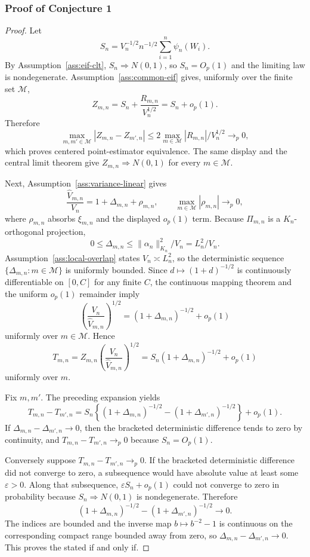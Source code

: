 \documentclass[11pt]{article}
\theoremstyle{definition}
\theoremstyle{plain}
\theoremstyle{remark}
\begin{document}
\subsubsection*{Proof of Conjecture 1}
\begin{proof}
Let
\[
  S_n=V_n^{-1/2}n^{-1/2}\sum_{i=1}^n\psi_n(W_i).
\]
By Assumption~\ref{ass:eif-clt}, \(S_n\Rightarrow N(0,1)\), so \(S_n=O_p(1)\)
and the limiting law is nondegenerate.  Assumption~\ref{ass:common-eif} gives,
uniformly over the finite set \(\mathcal M\),
\[
  Z_{m,n}=S_n+\frac{R_{m,n}}{V_n^{1/2}}
  =S_n+o_p(1).
\]
Therefore
\[
  \max_{m,m'\in\mathcal M}|Z_{m,n}-Z_{m',n}|
  \le
  2\max_{m\in\mathcal M}|R_{m,n}|/V_n^{1/2}
  \to_p0,
\]
which proves centered point-estimator equivalence.  The same display and the
central limit theorem give \(Z_{m,n}\Rightarrow N(0,1)\) for every
\(m\in\mathcal M\).

Next, Assumption~\ref{ass:variance-linear} gives
\[
  \frac{\hat V_{m,n}}{V_n}=1+\Delta_{m,n}+\rho_{m,n},
  \qquad
  \max_{m\in\mathcal M}|\rho_{m,n}|\to_p0,
\]
where \(\rho_{m,n}\) absorbs \(\xi_{m,n}\) and the displayed \(o_p(1)\) term.
Because \(\Pi_{m,n}\) is a \(K_n\)-orthogonal projection,
\[
  0\le\Delta_{m,n}
  \le \|\alpha_n\|_{K_n}^2/V_n
  =L_n^2/V_n.
\]
Assumption~\ref{ass:local-overlap} states \(V_n\asymp L_n^2\), so the
deterministic sequence \(\{\Delta_{m,n}:m\in\mathcal M\}\) is uniformly
bounded.  Since \(d\mapsto(1+d)^{-1/2}\) is continuously differentiable on
\([0,C]\) for any finite \(C\), the continuous mapping theorem and the
uniform \(o_p(1)\) remainder imply
\[
  \left(\frac{V_n}{\hat V_{m,n}}\right)^{1/2}
  =
  (1+\Delta_{m,n})^{-1/2}+o_p(1)
\]
uniformly over \(m\in\mathcal M\).  Hence
\[
  T_{m,n}
  =
  Z_{m,n}\left(\frac{V_n}{\hat V_{m,n}}\right)^{1/2}
  =
  S_n(1+\Delta_{m,n})^{-1/2}+o_p(1)
\]
uniformly over \(m\).

Fix \(m,m'\).  The preceding expansion yields
\[
  T_{m,n}-T_{m',n}
  =
  S_n\left\{(1+\Delta_{m,n})^{-1/2}
      -(1+\Delta_{m',n})^{-1/2}\right\}
  +o_p(1).
\]
If \(\Delta_{m,n}-\Delta_{m',n}\to0\), then the bracketed deterministic
difference tends to zero by continuity, and \(T_{m,n}-T_{m',n}\to_p0\)
because \(S_n=O_p(1)\).

Conversely suppose \(T_{m,n}-T_{m',n}\to_p0\).  If the bracketed deterministic
difference did not converge to zero, a subsequence would have absolute value
at least some \(\varepsilon>0\).  Along that subsequence,
\(\varepsilon S_n+o_p(1)\) could not converge to zero in probability because
\(S_n\Rightarrow N(0,1)\) is nondegenerate.  Therefore
\[
  (1+\Delta_{m,n})^{-1/2}
      -(1+\Delta_{m',n})^{-1/2}\to0.
\]
The indices are bounded and the inverse map \(b\mapsto b^{-2}-1\) is
continuous on the corresponding compact range bounded away from zero, so
\(\Delta_{m,n}-\Delta_{m',n}\to0\).  This proves the stated if and only if.


\end{proof}
\end{document}
